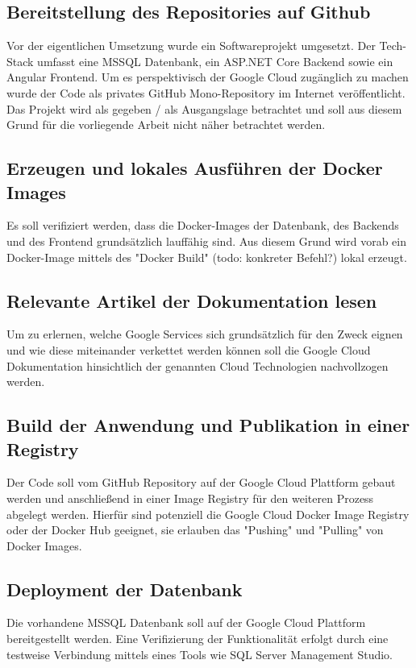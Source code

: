 \documentclass[pdftex,a4paper,abstracton,11pt,parskip=half,bibtotocnumbered]{scrartcl}
\begin{document}
	\subsection{Bereitstellung des Repositories auf Github}
	Vor der eigentlichen Umsetzung wurde ein Softwareprojekt umgesetzt. Der Tech-Stack umfasst eine MSSQL Datenbank, ein ASP.NET Core Backend sowie	ein
	Angular Frontend. Um es perspektivisch der Google Cloud zugänglich zu machen wurde der Code als privates GitHub Mono-Repository im Internet veröffentlicht.
	Das Projekt wird als gegeben / als Ausgangslage betrachtet und soll aus diesem Grund für die vorliegende Arbeit nicht näher betrachtet werden.  

	\subsection{Erzeugen und lokales Ausführen der Docker Images}
	Es soll verifiziert werden, dass die Docker-Images der Datenbank, des Backends und des Frontend grundsätzlich lauffähig sind. Aus diesem Grund wird 
	vorab ein Docker-Image mittels des "Docker Build" (todo: konkreter Befehl?) lokal erzeugt.

	\subsection{Relevante Artikel der Dokumentation lesen}
	Um zu erlernen, welche Google Services sich grundsätzlich für den Zweck eignen und wie diese miteinander verkettet werden können soll die Google
	Cloud Dokumentation hinsichtlich der genannten Cloud Technologien nachvollzogen werden.

	\subsection{Build der Anwendung und Publikation in einer Registry}
	Der Code soll vom GitHub Repository auf der Google Cloud Plattform gebaut werden und anschließend in einer Image Registry für den weiteren Prozess
	abgelegt werden. Hierfür sind potenziell die Google Cloud Docker Image Registry oder der Docker Hub geeignet, sie erlauben das "Pushing" und "Pulling"
	von Docker Images. 

	\subsection{Deployment der Datenbank}
	Die vorhandene MSSQL Datenbank soll auf der Google Cloud Plattform bereitgestellt werden. Eine Verifizierung der Funktionalität erfolgt durch 
	eine testweise Verbindung mittels eines Tools wie SQL Server Management Studio. 
\end{document}

